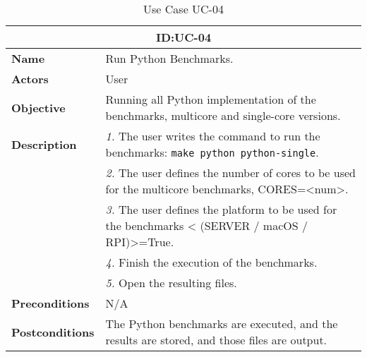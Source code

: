 \begin{table}[H]
    \centering
    \begin{tabular}{l p{10cm}}
        \toprule
        \multicolumn{2}{c}{\textbf{ID:\@ UC-04}} \\
        \toprule
        \textbf{Name}                         &  Run Python Benchmarks. \\
        \textbf{Actors}                       &  User \\
        \textbf{Objective}                    &  Running all Python implementation of the benchmarks, multicore and single-core versions. \\
        \multirow{1}{*}{\textbf{Description}} & \textsl{1.} The user writes the command to run the benchmarks: \texttt{make python python-single}.\\
                                              & \textsl{2.} The user defines the number of cores to be used for the multicore benchmarks, CORES=<num>.\\
                                              & \textsl{3.} The user defines the platform to be used for the benchmarks < (SERVER / macOS / RPI)>=True.\\
                                              & \textsl{4.} Finish the execution of the benchmarks.\\
                                              & \textsl{5.} Open the resulting files.\\
        \textbf{Preconditions}                &  N/A \\
        \textbf{Postconditions}               &  The Python benchmarks are executed, and the results are stored, and those files are output. \\
    \end{tabular}
    \caption{Use Case UC-04}\label{tab:uc-04}
\end{table}


